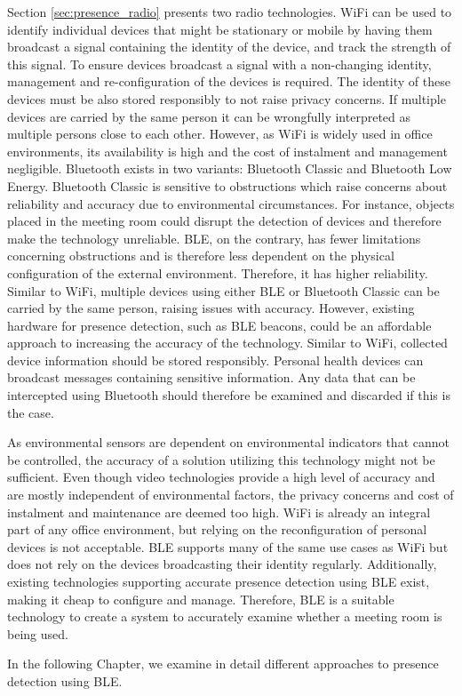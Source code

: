 Section \ref{sec:presence_radio} presents two radio technologies. 
WiFi can be used to identify individual devices that might be stationary or mobile by having them broadcast a signal containing the identity of the device, and track the strength of this signal.
To ensure devices broadcast a signal with a non-changing identity,  management and re-configuration of the devices is required.
The identity of these devices must be also stored responsibly to not raise privacy concerns.
If multiple devices are carried by the same person it can be wrongfully interpreted as multiple persons close to each other. 
However, as WiFi is widely used in office environments, its availability is high and the cost of instalment and management negligible.
Bluetooth exists in two variants: Bluetooth Classic and Bluetooth Low Energy.
Bluetooth Classic is sensitive to obstructions which raise concerns about reliability and accuracy due to environmental circumstances. 
For instance, objects placed in the meeting room could disrupt the detection of devices and therefore make the technology unreliable.
BLE, on the contrary, has fewer limitations concerning obstructions and is therefore less dependent on the physical configuration of the external environment. 
Therefore, it has higher reliability.
Similar to WiFi, multiple devices using either BLE or Bluetooth Classic can be carried by the same person, raising issues with accuracy.
However, existing hardware for presence detection, such as BLE beacons, could be an affordable approach to increasing the accuracy of the technology.  
Similar to WiFi, collected device information should be stored responsibly.
Personal health devices  can broadcast messages containing sensitive information.
Any data that can be intercepted using Bluetooth should therefore be examined and discarded if this is the case.

As environmental sensors are dependent on environmental indicators that cannot be controlled, the accuracy of a solution utilizing this technology might not be sufficient.
Even though video technologies provide a high level of accuracy and are mostly independent of environmental factors, the privacy concerns and cost of instalment and maintenance are deemed too high.
WiFi is already an integral part of any office environment, but relying on the reconfiguration of personal devices is not acceptable. 
BLE supports many of the same use cases as WiFi but does not rely on the devices broadcasting their identity regularly.
Additionally, existing technologies supporting accurate presence detection using BLE exist, making it cheap to configure and manage. 
Therefore, BLE is a suitable technology to create a system to accurately examine whether a meeting room is being used.

In the following Chapter, we examine in detail different approaches to presence detection using BLE.